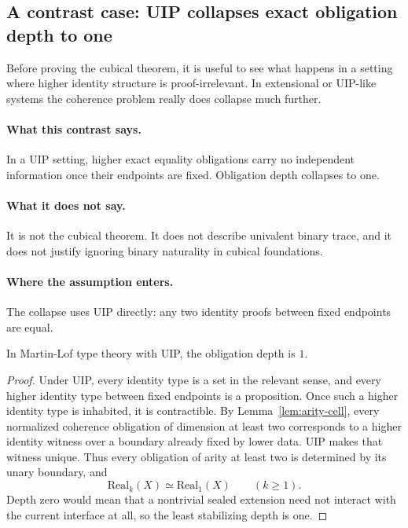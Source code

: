 \subsection{A contrast case: UIP collapses exact obligation depth to one}
\label{subsec:UIP-depth-one}

Before proving the cubical theorem, it is useful to see what happens in a setting where
higher identity structure is proof-irrelevant.  In extensional or UIP-like systems the
coherence problem really does collapse much further.

\paragraph{What this contrast says.}
In a UIP setting, higher exact equality obligations carry no independent information once
their endpoints are fixed.  Obligation depth collapses to one.

\paragraph{What it does not say.}
It is not the cubical theorem.  It does not describe univalent binary trace, and it does not
justify ignoring binary naturality in cubical foundations.

\paragraph{Where the assumption enters.}
The collapse uses UIP directly: any two identity proofs between fixed endpoints are equal.

\begin{theorem}
\label{thm:UIP-depth-one}
In Martin-Lof type theory with UIP, the obligation depth is \(1\).
\end{theorem}

\begin{proof}
Under UIP, every identity type is a set in the relevant sense, and every higher identity type
between fixed endpoints is a proposition.  Once such a higher identity type is inhabited, it
is contractible.  By Lemma~\ref{lem:arity-cell}, every normalized coherence obligation of
dimension at least two corresponds to a higher identity witness over a boundary already fixed
by lower data.  UIP makes that witness unique.  Thus every obligation of arity at least two
is determined by its unary boundary, and
\[
  \mathrm{Real}_k(X) \simeq \mathrm{Real}_1(X)
  \qquad (k\geq 1).
\]
Depth zero would mean that a nontrivial sealed extension need not interact with the current
interface at all, so the least stabilizing depth is one.
\end{proof}

